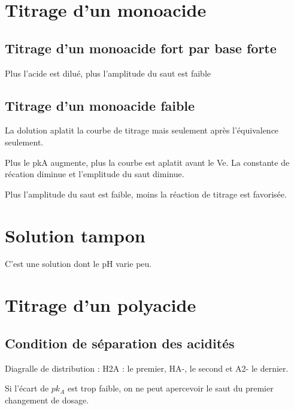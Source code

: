 \documentclass[french]{yLectureNote}
\begin{document}
\section{Titrage d'un monoacide}
\subsection{Titrage d'un monoacide fort par base forte}
Plus l'acide est dilué, plus l'amplitude du saut est faible
\subsection{Titrage d'un monoacide faible}
La dolution aplatit la courbe de titrage mais seulement après l'équivalence seulement.

Plus le pkA augmente, plus la courbe est aplatit avant le Ve. La constante de récation diminue et l'emplitude du saut diminue.

Plus l'amplitude du saut est faible, moins la réaction de titrage est favorisée.
\section{Solution tampon}
\begin{definition}
C'est une solution dont le pH varie peu.
\end{definition}
\section{Titrage d'un polyacide}
\subsection{Condition de séparation des acidités}
Diagralle de distribution : H2A : le premier, HA-, le second et A2- le dernier.

Si l'écart de \(pk_A\) est trop faible, on ne peut apercevoir le saut du premier changement de dosage.

\end{document}
